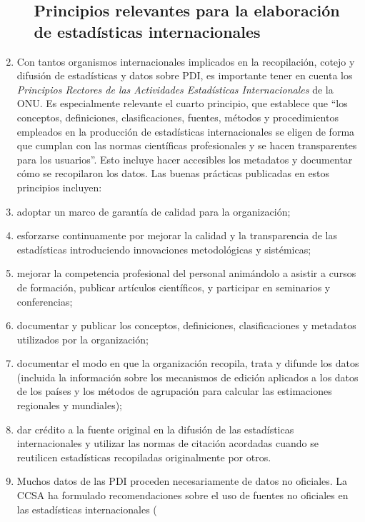 \documentclass[
]{book}
\begin{document}
\begin{enumerate}
\begin{enumerate}
{    \subsection{Principios relevantes para la elaboración de estadísticas internacionales}\label{principios-relevantes-para-la-elaboraciuxf3n-de-estaduxedsticas-internacionales}}
  \end{enumerate}
\item
  Con tantos organismos internacionales implicados en la recopilación, cotejo y difusión de estadísticas y datos sobre PDI, es importante tener en cuenta los \emph{Principios Rectores de las Actividades Estadísticas Internacionales} de la ONU. Es especialmente relevante el cuarto principio, que establece que ``los conceptos, definiciones, clasificaciones, fuentes, métodos y procedimientos empleados en la producción de estadísticas internacionales se eligen de forma que cumplan con las normas científicas profesionales y se hacen transparentes para los usuarios''. Esto incluye hacer accesibles los metadatos y documentar cómo se recopilaron los datos. Las buenas prácticas publicadas en estos principios incluyen:
\item
  adoptar un marco de garantía de calidad para la organización;
\item
  esforzarse continuamente por mejorar la calidad y la transparencia de las estadísticas introduciendo innovaciones metodológicas y sistémicas;
\item
  mejorar la competencia profesional del personal animándolo a asistir a cursos de formación, publicar artículos científicos, y participar en seminarios y conferencias;
\item
  documentar y publicar los conceptos, definiciones, clasificaciones y metadatos utilizados por la organización;
\item
  documentar el modo en que la organización recopila, trata y difunde los datos (incluida la información sobre los mecanismos de edición aplicados a los datos de los países y los métodos de agrupación para calcular las estimaciones regionales y mundiales);
\item
  dar crédito a la fuente original en la difusión de las estadísticas internacionales y utilizar las normas de citación acordadas cuando se reutilicen estadísticas recopiladas originalmente por otros.
\item
  Muchos datos de las PDI proceden necesariamente de datos no oficiales. La CCSA ha formulado recomendaciones sobre el uso de fuentes no oficiales en las estadísticas internacionales (

\end{enumerate}
\end{document}
